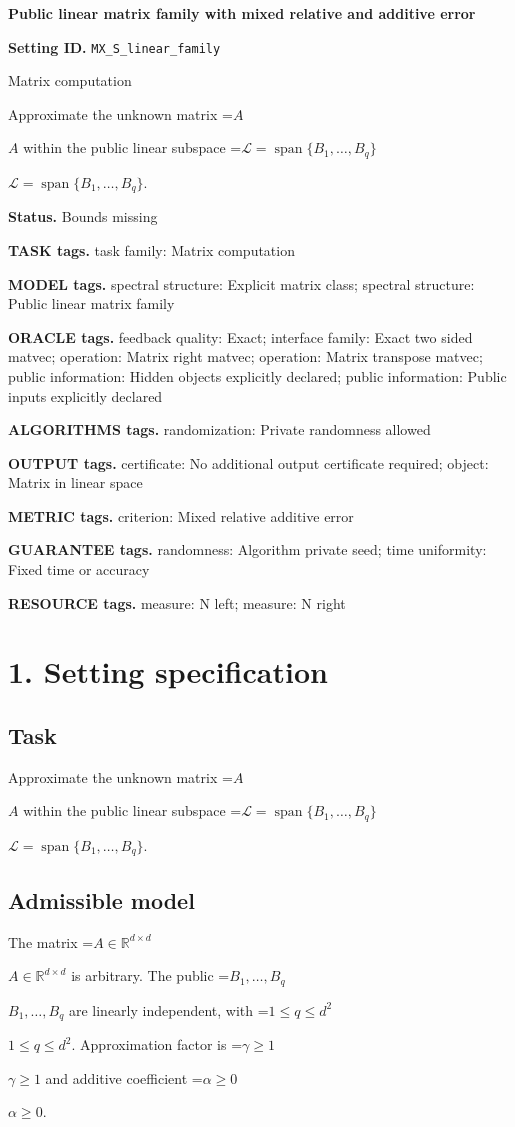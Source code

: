 \documentclass[10pt,a4paper]{article}
\newcommand{\AtlasMath}[1]{\par\begingroup\centering\setbox0=\hbox{$\displaystyle #1$}\ifdim\wd0>1.4\linewidth\typeout{ATLAS WIDE FORMULA: \the\wd0}\fi\ifdim\wd0>\linewidth\resizebox{\linewidth}{!}{\box0}\else\box0\fi\par\endgroup}
\newcommand{\AtlasInlineMath}[1]{\begingroup\setbox0=\hbox{$#1$}\ifdim\wd0>.4\linewidth\endgroup\AtlasMath{#1}\else\endgroup$#1$\fi}
\begin{document}
\raggedright

{\LARGE\bfseries\sffamily\color{AtlasNavy} Public linear matrix family with mixed relative and additive error\par}\vspace{5pt}
\textbf{Setting ID.} \texttt{MX\_\allowbreak{}S\_\allowbreak{}linear\_\allowbreak{}family}

Matrix computation

Approximate the unknown matrix \AtlasInlineMath{A} within the public linear subspace \AtlasInlineMath{\mathcal{L}=\operatorname{span}\{B_1,\ldots,B_q\}}.

\textbf{Status.} Bounds missing

\textbf{TASK tags.} task family: Matrix computation

\textbf{MODEL tags.} spectral structure: Explicit matrix class; spectral structure: Public linear matrix family

\textbf{ORACLE tags.} feedback quality: Exact; interface family: Exact two sided matvec; operation: Matrix right matvec; operation: Matrix transpose matvec; public information: Hidden objects explicitly declared; public information: Public inputs explicitly declared

\textbf{ALGORITHMS tags.} randomization: Private randomness allowed

\textbf{OUTPUT tags.} certificate: No additional output certificate required; object: Matrix in linear space

\textbf{METRIC tags.} criterion: Mixed relative additive error

\textbf{GUARANTEE tags.} randomness: Algorithm private seed; time uniformity: Fixed time or accuracy

\textbf{RESOURCE tags.} measure: N left; measure: N right

\section{1. Setting specification}
\subsection{Task}
Approximate the unknown matrix \AtlasInlineMath{A} within the public linear subspace \AtlasInlineMath{\mathcal{L}=\operatorname{span}\{B_1,\ldots,B_q\}}.

\subsection{Admissible model}
The matrix \AtlasInlineMath{A\in\mathbb{R}^{d\times d}} is arbitrary. The public \AtlasInlineMath{B_1,\ldots,B_q} are linearly independent, with \AtlasInlineMath{1\le q\le d^2}. Approximation factor is \AtlasInlineMath{\gamma\ge1} and additive coefficient \AtlasInlineMath{\alpha\ge0}.
\end{document}
